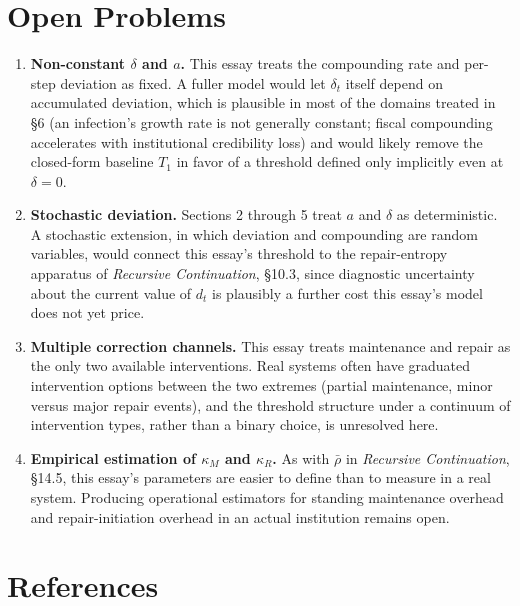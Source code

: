\documentclass[11pt]{article}
\begin{document}
\section*{Open Problems}

\begin{enumerate}
\item \textbf{Non-constant $\delta$ and $a$.} This essay treats the compounding rate and per-step deviation as fixed. A fuller model would let $\delta_t$ itself depend on accumulated deviation, which is plausible in most of the domains treated in \S 6 (an infection's growth rate is not generally constant; fiscal compounding accelerates with institutional credibility loss) and would likely remove the closed-form baseline $T_1$ in favor of a threshold defined only implicitly even at $\delta = 0$.
\item \textbf{Stochastic deviation.} Sections 2 through 5 treat $a$ and $\delta$ as deterministic. A stochastic extension, in which deviation and compounding are random variables, would connect this essay's threshold to the repair-entropy apparatus of \emph{Recursive Continuation}, \S 10.3, since diagnostic uncertainty about the current value of $d_t$ is plausibly a further cost this essay's model does not yet price.
\item \textbf{Multiple correction channels.} This essay treats maintenance and repair as the only two available interventions. Real systems often have graduated intervention options between the two extremes (partial maintenance, minor versus major repair events), and the threshold structure under a continuum of intervention types, rather than a binary choice, is unresolved here.
\item \textbf{Empirical estimation of $\kappa_M$ and $\kappa_R$.} As with $\bar\rho$ in \emph{Recursive Continuation}, \S 14.5, this essay's parameters are easier to define than to measure in a real system. Producing operational estimators for standing maintenance overhead and repair-initiation overhead in an actual institution remains open.
\end{enumerate}

\section*{References}
\end{document}

